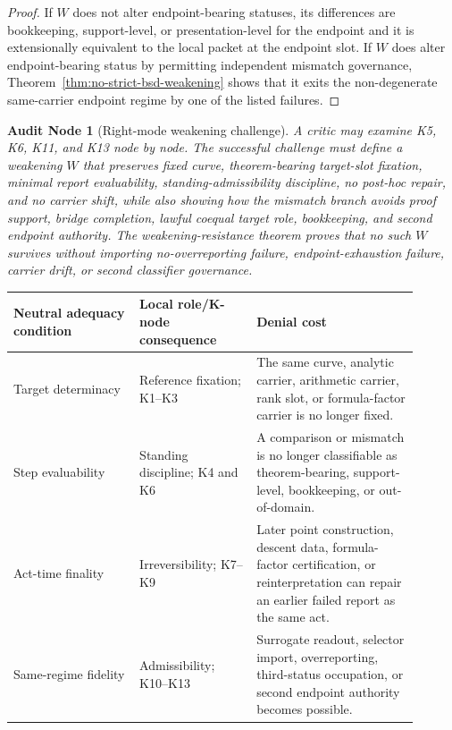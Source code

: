 \documentclass[11pt]{article}
\newtheorem{audit}[theorem]{Audit Node}
\begin{document}
\begin{proof}
If $W$ does not alter endpoint-bearing statuses, its differences are bookkeeping, support-level, or presentation-level for the endpoint and it is extensionally equivalent to the local packet at the endpoint slot. If $W$ does alter endpoint-bearing status by permitting independent mismatch governance, Theorem~\ref{thm:no-strict-bsd-weakening} shows that it exits the non-degenerate same-carrier endpoint regime by one of the listed failures.
\end{proof}

\begin{audit}[Right-mode weakening challenge]\label{audit:right-mode-weakening-bsd}
A critic may examine K5, K6, K11, and K13 node by node. The successful challenge must define a weakening $W$ that preserves fixed curve, theorem-bearing target-slot fixation, minimal report evaluability, standing-admissibility discipline, no post-hoc repair, and no carrier shift, while also showing how the mismatch branch avoids proof support, bridge completion, lawful coequal target role, bookkeeping, and second endpoint authority. The weakening-resistance theorem proves that no such $W$ survives without importing no-overreporting failure, endpoint-exhaustion failure, carrier drift, or second classifier governance.
\end{audit}

\begin{longtable}{L{0.28\linewidth}L{0.26\linewidth}L{0.36\linewidth}}
\toprule
\textbf{Neutral adequacy condition} & \textbf{Local role/K-node consequence} & \textbf{Denial cost}
\\
\midrule
Target determinacy & Reference fixation; K1--K3 & The same curve, analytic carrier, arithmetic carrier, rank slot, or formula-factor carrier is no longer fixed.\\
Step evaluability & Standing discipline; K4 and K6 & A comparison or mismatch is no longer classifiable as theorem-bearing, support-level, bookkeeping, or out-of-domain.\\
Act-time finality & Irreversibility; K7--K9 & Later point construction, descent data, formula-factor certification, or reinterpretation can repair an earlier failed report as the same act.\\
Same-regime fidelity & Admissibility; K10--K13 & Surrogate readout, selector import, overreporting, third-status occupation, or second endpoint authority becomes possible.\\
\bottomrule
\end{longtable}
\end{document}
